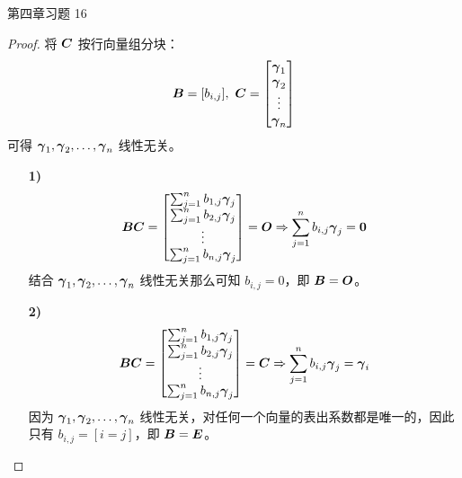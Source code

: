 \begin{problem}
	第四章习题 16

	\begin{proof}
		将 $\boldsymbol{C}$ 按行向量组分块：
		$$
		\matr{B} = [b_{i,j}],\ \matr{C} = \begin{bmatrix}
			\vect{\gamma}_1 \\ \vect{\gamma}_2 \\ \vdots \\ \vect{\gamma}_n
		\end{bmatrix}
		$$
		可得 $\boldsymbol{\gamma}_1, \boldsymbol{\gamma}_2, \dots, \boldsymbol{\gamma}_n$ 线性无关。

		\begin{enumerate}
			\item[\textbf{1)}]
			$$
			\boldsymbol{B} \boldsymbol{C} = \begin{bmatrix}
				\sum_{j=1}^n b_{1,j} \boldsymbol{\gamma}_j \\
				\sum_{j=1}^n b_{2,j} \boldsymbol{\gamma}_j \\
				\vdots \\
				\sum_{j=1}^n b_{n,j} \boldsymbol{\gamma}_j
			\end{bmatrix} = \boldsymbol{O} \Rightarrow \sum_{j=1}^n b_{i,j} \boldsymbol{\gamma}_j = \boldsymbol{0}
			$$
			结合 $\boldsymbol{\gamma}_1, \boldsymbol{\gamma}_2, \dots, \boldsymbol{\gamma}_n$ 线性无关那么可知 $b_{i,j} = 0$，即 $\boldsymbol{B} = \boldsymbol{O}$。

			\item[\textbf{2)}]
			$$
			\boldsymbol{B} \boldsymbol{C} = \begin{bmatrix}
				\sum_{j=1}^n b_{1,j} \boldsymbol{\gamma}_j \\
				\sum_{j=1}^n b_{2,j} \boldsymbol{\gamma}_j \\
				\vdots \\
				\sum_{j=1}^n b_{n,j} \boldsymbol{\gamma}_j
			\end{bmatrix} = \boldsymbol{C} \Rightarrow \sum_{j=1}^n b_{i,j} \boldsymbol{\gamma}_j = \boldsymbol{\gamma}_i
			$$
			因为 $\boldsymbol{\gamma}_1, \boldsymbol{\gamma}_2, \dots, \boldsymbol{\gamma}_n$ 线性无关，对任何一个向量的表出系数都是唯一的，因此只有 $b_{i,j} = [i=j]$，即 $\boldsymbol{B} = \boldsymbol{E}$。
		\end{enumerate}
	\end{proof}
\end{problem}

